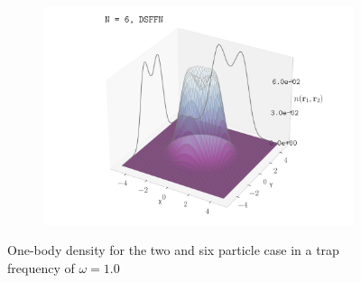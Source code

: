 \begin{figure}[H]
\begin{subfigure}[t]{0.32\textwidth}
        \label{fig:sub2}
    \end{subfigure}
    \begin{subfigure}[t]{0.32\textwidth}
        \centering
        \includegraphics[width=\textwidth]{Chapters/Results/dots/density_profile_3d_N6_nqs_dsffn_1.0.pdf}
        \label{fig:sub3}
    \end{subfigure}
    \caption{One-body density for the two and six particle case in a trap frequency of $\omega = 1.0$}
    \label{fig:total}
\end{figure}